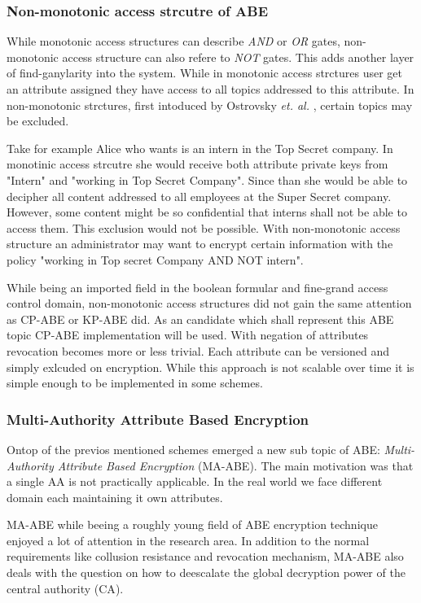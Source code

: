 \subsubsection{Non-monotonic access strcutre of \ac{ABE}}
While monotonic access structures can describe \textit{AND} or \textit{OR} gates, non-monotonic access structure can also refere to \textit{NOT} gates. This adds another layer of find-ganylarity into the system. While in monotonic access strctures user get an attribute assigned they have access to all topics addressed to this attribute. In non-monotonic strctures, first intoduced by Ostrovsky \textit{et. al.} \cite{Ostrovsky:2007:AEN:1315245.1315270}, certain topics may be excluded. 

Take for example Alice who wants is an intern in the Top Secret company. In monotinic access strcutre she would receive both attribute private keys from "Intern" and "working in Top Secret Company". Since than she would be able to decipher all content addressed to all employees at the Super Secret company. However, some content might be so confidential that interns shall not be able to access them. This exclusion would not be possible. With non-monotonic access structure an administrator may want to encrypt certain information with the policy "working in Top secret Company AND NOT intern".  

While being an imported field in the boolean formular and fine-grand access control domain, non-monotonic access structures did not gain the same attention as \ac{CP-ABE} or \ac{KP-ABE} did. As an candidate which shall represent this \ac{ABE} topic \cite{10.1007/978-3-642-54631-0_16} \ac{CP-ABE} implementation will be used. With negation of attributes revocation becomes more or less trivial. Each attribute can be versioned and simply exlcuded on encryption. While this approach is not scalable over time it is simple enough to be implemented in some schemes.   

\subsubsection{Multi-Authority Attribute Based Encryption}
Ontop of the previos mentioned schemes emerged a new sub topic of \ac{ABE}: \textit{Multi-Authority Attribute Based Encryption} (\ac{MA-ABE}). The main motivation was that a single \ac{AA} is not practically applicable. In the real world we face different domain each maintaining it own attributes. 

\ac{MA-ABE} while beeing a roughly young field of \ac{ABE} encryption technique enjoyed a lot of attention in the research area. In addition to the normal requirements like collusion resistance and revocation mechanism, \ac{MA-ABE} also deals with the question on how to deescalate the global decryption power of the central authority (\ac{CA}). 

